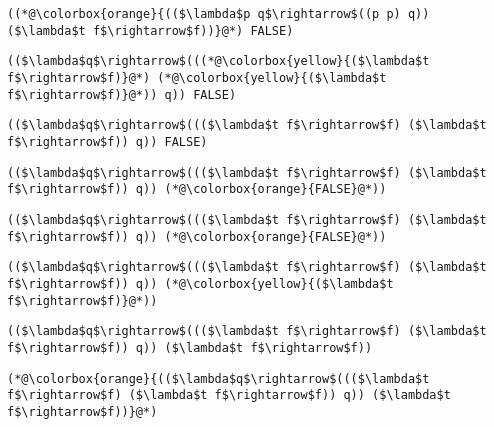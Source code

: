 \documentclass{beamer}
\begin{document}
\begin{frame}[fragile]{\CurrentSection}
\lstset{basicstyle=\ttfamily\small}\lstset{numbers=none}\lstset{language=ML}\begin{lstlisting}
((*@\colorbox{orange}{(($\lambda$p q$\rightarrow$((p p) q)) ($\lambda$t f$\rightarrow$f))}@*) FALSE)
\end{lstlisting}
\pause\lstset{language=ML}\begin{lstlisting}
(($\lambda$q$\rightarrow$(((*@\colorbox{yellow}{($\lambda$t f$\rightarrow$f)}@*) (*@\colorbox{yellow}{($\lambda$t f$\rightarrow$f)}@*)) q)) FALSE)
\end{lstlisting}

\end{frame}

\begin{frame}[fragile]{\CurrentSection}
\lstset{basicstyle=\ttfamily\small}\lstset{numbers=none}\lstset{language=ML}\begin{lstlisting}
(($\lambda$q$\rightarrow$((($\lambda$t f$\rightarrow$f) ($\lambda$t f$\rightarrow$f)) q)) FALSE)
\end{lstlisting}
\pause\lstset{language=ML}\begin{lstlisting}
(($\lambda$q$\rightarrow$((($\lambda$t f$\rightarrow$f) ($\lambda$t f$\rightarrow$f)) q)) (*@\colorbox{orange}{FALSE}@*))
\end{lstlisting}

\end{frame}

\begin{frame}[fragile]{\CurrentSection}
\lstset{basicstyle=\ttfamily\small}\lstset{numbers=none}\lstset{language=ML}\begin{lstlisting}
(($\lambda$q$\rightarrow$((($\lambda$t f$\rightarrow$f) ($\lambda$t f$\rightarrow$f)) q)) (*@\colorbox{orange}{FALSE}@*))
\end{lstlisting}
\pause\lstset{language=ML}\begin{lstlisting}
(($\lambda$q$\rightarrow$((($\lambda$t f$\rightarrow$f) ($\lambda$t f$\rightarrow$f)) q)) (*@\colorbox{yellow}{($\lambda$t f$\rightarrow$f)}@*))
\end{lstlisting}

\end{frame}

\begin{frame}[fragile]{\CurrentSection}
\lstset{basicstyle=\ttfamily\small}\lstset{numbers=none}\lstset{language=ML}\begin{lstlisting}
(($\lambda$q$\rightarrow$((($\lambda$t f$\rightarrow$f) ($\lambda$t f$\rightarrow$f)) q)) ($\lambda$t f$\rightarrow$f))
\end{lstlisting}
\pause\lstset{language=ML}\begin{lstlisting}
(*@\colorbox{orange}{(($\lambda$q$\rightarrow$((($\lambda$t f$\rightarrow$f) ($\lambda$t f$\rightarrow$f)) q)) ($\lambda$t f$\rightarrow$f))}@*)
\end{lstlisting}

\end{frame}
\end{document}
